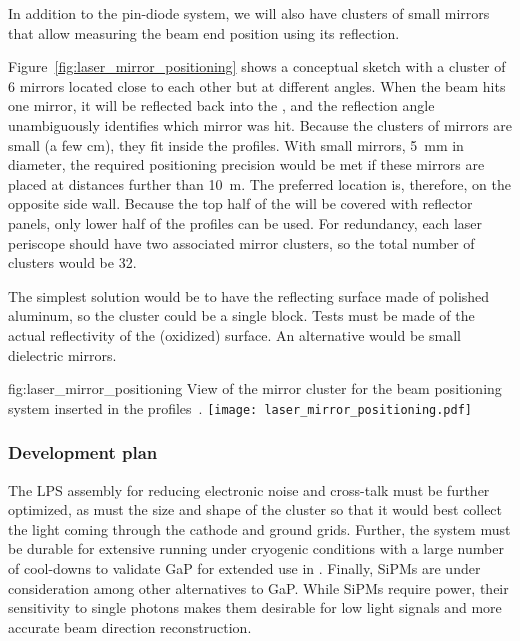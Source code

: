 In addition to the pin-diode system, we will also have clusters of small mirrors that allow measuring the beam end position using its reflection.

Figure~\ref{fig:laser_mirror_positioning} shows a conceptual sketch with a cluster of 6 mirrors located close to each other but at different angles. When the beam hits one mirror, it will be reflected back into the , and the reflection angle unambiguously identifies which mirror was hit. Because the clusters of mirrors are small (a few cm), they fit inside the  profiles. With small mirrors, \SI{5}{\milli\m} in diameter, the required positioning precision would be met if these mirrors are placed at distances further than \SI{10}{\m}. The preferred location is, therefore, on the opposite  side wall. Because the top half of the  will be covered with  reflector panels, only lower half of the  profiles can be used. For redundancy, each laser periscope should have two associated mirror clusters, so the total number of clusters would be \num{32}. 

The simplest solution would be to have the reflecting surface made of polished aluminum, so the cluster could be a single block. Tests must be made of the actual reflectivity of the (oxidized) surface. An alternative would be small dielectric mirrors.

\begin{dunefigure}{fig:laser_mirror_positioning}
{View of the mirror cluster for the beam positioning system inserted in the  profiles~\cite{bib:yu2019a}.}
\texttt{[image: laser\_mirror\_positioning.pdf]}
\end{dunefigure}

\subsubsection{Development plan}
 The LPS assembly for reducing electronic noise and cross-talk must be further optimized, as must the size and shape of the cluster so that it would best collect the light coming through the cathode and ground grids.  Further, the system must be durable for extensive running under cryogenic conditions with  a large number of cool-downs to validate GaP for extended use in . Finally, SiPMs are under consideration among other alternatives to GaP. While SiPMs require power, their sensitivity to single photons makes them desirable for low light signals and more accurate beam direction reconstruction. 
    
















